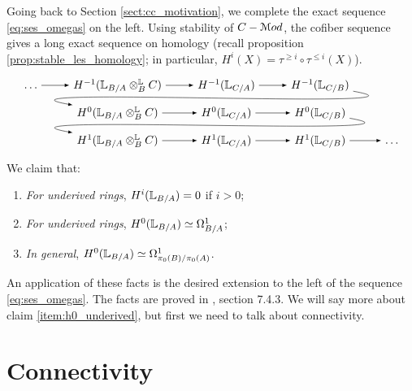 Going back to Section \ref{sect:cc_motivation}, we complete the exact sequence \ref{eq:ses_omegas} on the left. 
Using stability of $C-\mathcal M od$, the cofiber sequence gives a long exact sequence on homology (recall proposition
\ref{prop:stable_les_homology}; in particular, $H^i(X) = \tau^{\geq i} \circ \tau^{\leq i}(X)$).
\[
\begin{tikzpicture}[descr/.style={fill=white,inner sep=1.5pt}]
\label{tikz:les}
        \matrix (m) [
            matrix of math nodes,
            row sep=1em,
            column sep=2.5em,
            text height=1.5ex, text depth=0.25ex
        ]
        { \dots & H^{-1}(\bbL_{B/A} \otimes^{\bbL}_{B} C) & H^{-1}(\bbL_{C/A}) & H^{-1}(\bbL_{C/B}) & \\
            & H^0(\bbL_{B/A} \otimes^{\bbL}_{B} C) & H^0(\bbL_{C/A}) & H^0(\bbL_{C/B}) & \\
            & H^1(\bbL_{B/A} \otimes^{\bbL}_{B} C) & H^1(\bbL_{C/A}) & H^1(\bbL_{C/B}) & \dots \\
        };

        \path[overlay,->, font=\scriptsize,>=latex]
        (m-1-1) edge (m-1-2)
        (m-1-2) edge (m-1-3)
        (m-1-3) edge (m-1-4)
        (m-1-4) edge[out=350,in=170]  (m-2-2)
        (m-2-2) edge (m-2-3)
        (m-2-3) edge (m-2-4)
        (m-2-4) edge[out=350,in=170]  (m-3-2)
        (m-3-2) edge (m-3-3)
        (m-3-3) edge (m-3-4)
				(m-3-4) edge (m-3-5);
\end{tikzpicture}
\]
We claim that:
\begin{enumerate}
\item \label{item:h0_underived}
\textit{For underived rings}, $H^i(\mathbb L_{B/A}) = 0$ if $i>0$;
\item \textit{For underived rings}, $H^0(\mathbb L_{B/A}) \simeq \Omega^1_{B/A}$;
\item \textit{In general}, $H^0(\mathbb L_{B/A}) \simeq \Omega^1_{\pi_0(B)/\pi_0(A)}$.
\end{enumerate}
An application of these facts is the desired extension
to the left of the sequence \ref{eq:ses_omegas}. The facts are proved in \cite{Lurie_Higher_algebra}, section 7.4.3. 
We will say more about claim \ref{item:h0_underived}, but first we need to talk about connectivity. 



\section{Connectivity}
\label{sect:cc_connectivity}

